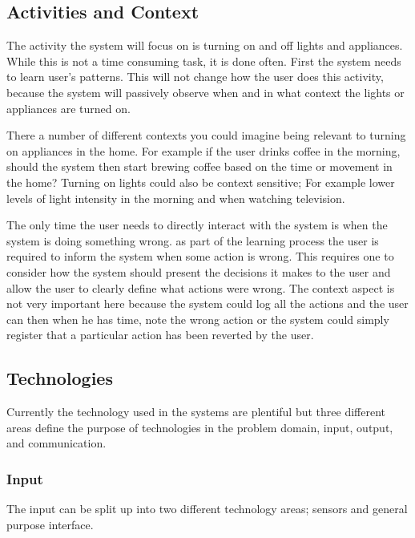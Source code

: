 \subsection{Activities and Context}
The activity the system will focus on is turning on and off lights and
appliances. While this is not a time consuming task, it is done often. First the
system needs to learn user's patterns. This will not change how the user does
this activity, because the system will passively observe when and in what
context the lights or appliances are turned on.

There a number of different
contexts you could imagine being relevant to turning on appliances in the home.
For example if the user drinks coffee in the morning, should the system then
start brewing coffee based on the time or movement in the home? Turning on
lights could also be context sensitive; For example lower levels of light
intensity in the morning and when watching television.

The only time the user needs to directly interact with the system is when the system is doing something wrong. as part of the learning process the user is required to inform the system when some action is wrong. This requires one to consider how the system should present the decisions it makes to the user and allow the user to clearly define what actions were wrong. The context aspect is not very important here because the system could log all the actions and the user can then when he has time, note the wrong action or the system could simply register that a particular action has been reverted by the user.

\subsection{Technologies}
\label{sub:Technologies}
Currently the technology used in the systems are plentiful but three different areas define the purpose of technologies in the problem domain, input, output, and communication.
\subsubsection{Input}
The input can be split up into two different technology areas; sensors and general purpose interface.

